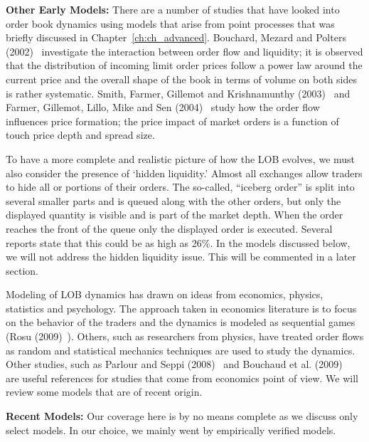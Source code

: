\noindent \textbf{Other Early Models:} There are a number of studies that have looked into order book dynamics using models that arise from point processes that was briefly discussed in Chapter~\ref{ch:ch_advanced}. Bouchard, Mezard and Polters (2002)~\cite{bouchardmezard} investigate the interaction between order flow and liquidity; it is observed that the distribution of incoming limit order prices follow a power law around the current price and the overall shape of the book in terms of volume on both sides is rather systematic. Smith, Farmer, Gillemot and Krishnamunthy (2003)~\cite{smithfarm} and Farmer, Gillemot, Lillo, Mike and Sen (2004)~\cite{farmermikesen} study how the order flow influences price formation; the price impact of market orders is a function of touch price depth and spread size. 


To have a more complete and realistic picture of how the LOB evolves, we must also consider the presence of `hidden liquidity.' Almost all exchanges allow traders to hide all or portions of their orders. The so-called, ``iceberg order'' is split into several smaller parts and is queued along with the other orders, but only the displayed quantity is visible and is part of the market depth. When the order reaches the front of the queue only the displayed order is executed. Several reports state that this could be as high as 26\%. In the models discussed below, we will not address the hidden liquidity issue. This will be commented in a later section.


Modeling of LOB dynamics has drawn on ideas from economics, physics, statistics and psychology. The approach taken in economics literature is to focus on the behavior of the traders and the dynamics is modeled as sequential games (Rosu (2009)~\cite{irosu09}). Others, such as researchers from physics, have treated order flows as random and statistical mechanics techniques are used to study the dynamics. Other studies, such as Parlour and Seppi (2008)~\cite{parseppi} and Bouchaud et al. (2009)~\cite{bouchaud2009} are useful references for studies that come from economics point of view. We will review some models that are of recent origin. \twomedskip


\noindent\textbf{Recent Models:} Our coverage here is by no means complete as we discuss only select models. In our choice, we mainly went by empirically verified models. \twomedskip


